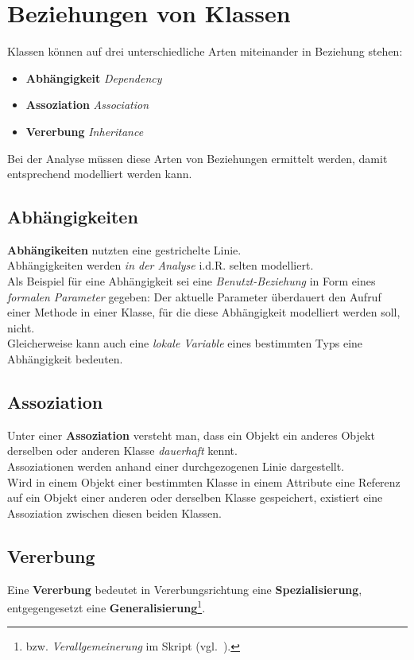 \section{Beziehungen von Klassen}\label{sec:beziehungen-von-klassen}

Klassen können auf drei unterschiedliche Arten miteinander in Beziehung stehen:

\begin{itemize}
    \item \textbf{Abhängigkeit} \textit{Dependency}
    \item \textbf{Assoziation} \textit{Association}
    \item \textbf{Vererbung} \textit{Inheritance}
\end{itemize}

\noindent
Bei der Analyse müssen diese Arten von Beziehungen ermittelt werden, damit entsprechend modelliert werden kann.\\

\subsection*{Abhängigkeiten}
\textbf{Abhängikeiten} nutzten eine gestrichelte Linie.\\
Abhängigkeiten werden \textit{in der Analyse} i.d.R. selten modelliert.\\
Als Beispiel für eine Abhängigkeit sei eine \textit{Benutzt-Beziehung} in Form eines \textit{formalen Parameter} gegeben: Der aktuelle Parameter überdauert den Aufruf einer Methode in einer Klasse, für die diese Abhängigkeit modelliert werden soll, nicht.\\
Gleicherweise kann auch eine \textit{lokale Variable} eines bestimmten Typs eine Abhängigkeit bedeuten.

\subsection*{Assoziation}
Unter einer \textbf{Assoziation} versteht man, dass ein Objekt ein anderes Objekt derselben oder anderen Klasse \textit{dauerhaft} kennt.\\
Assoziationen werden anhand einer durchgezogenen Linie dargestellt.\\
Wird in einem Objekt einer bestimmten Klasse in einem Attribute eine Referenz auf ein Objekt einer anderen oder derselben Klasse gespeichert, existiert eine Assoziation zwischen diesen beiden Klassen.

\subsection*{Vererbung}
Eine \textbf{Vererbung} bedeutet in Vererbungsrichtung eine \textbf{Spezialisierung}, entgegengesetzt eine \textbf{Generalisierung}\footnote{
bzw. \textit{Verallgemeinerung} im Skript (vgl.~\cite[7]{Wed09b}).
}.

